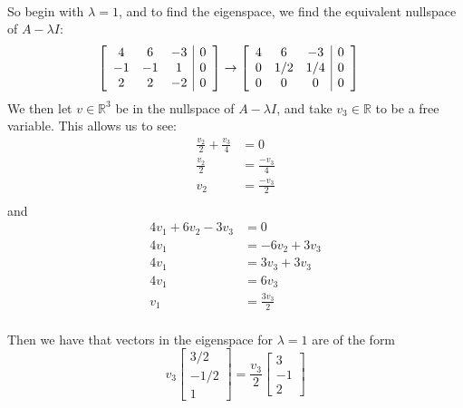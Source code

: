 \documentclass{article}
\begin{document}
\begin{solution}
\paragraph{}
So begin with $\lambda = 1$, and to find the eigenspace, we find the equivalent nullspace of $A-\lambda I$:
\begin{align*}
\left[
\begin{array}{c c c | c}
4 & 6 & -3 & 0\\
-1 & -1 & 1 & 0 \\
2 & 2 & -2 & 0
\end{array}
\right]
&\to
\left[
\begin{array}{c c c | c}
4 & 6 & -3 & 0\\
0 & 1/2 & 1/4 & 0 \\
0 & 0 & 0 & 0
\end{array}
\right]
\end{align*}
We then let $v\in\mathbb{R}^{3}$ be in the nullspace of $A-\lambda I$, and take $v_{3}\in\mathbb{R}$ to be a free variable. This allows us to see:
\begin{align*}
\frac{v_{2}}{2} + \frac{v_{3}}{4} &= 0 \\
\frac{v_{2}}{2} &= \frac{-v_{3}}{4} \\
v_{2} &= \frac{-v_{3}}{2} \\
\end{align*}
and 
\begin{align*}
4v_{1} + 6v_{2} -3v_{3} &= 0 \\
4v_{1} &= -6v_{2} +3v_{3} \\
4v_{1} &= 3v_{3} +3v_{3} \\
4v_{1} &= 6v_{3} \\
v_{1} &= \frac{3v_{3}}{2} \\
\end{align*}

Then we have that vectors in the eigenspace for $\lambda = 1$ are of the form
\[
v_{3}
\begin{bmatrix}
3/2\\ -1/2\\ 1
\end{bmatrix}
=
\frac{v_{3}}{2}
\begin{bmatrix}
3\\ -1\\ 2
\end{bmatrix} 
\]


\end{solution}
\end{document}
